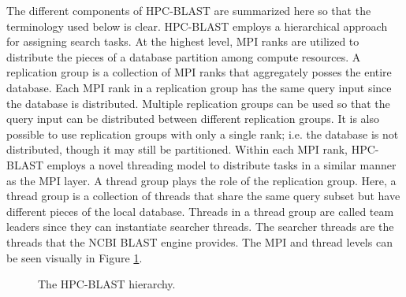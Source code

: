 \documentclass[10pt]{article}
\begin{document}
The different components of HPC-BLAST are summarized here so that the terminology used below is clear.  HPC-BLAST employs a hierarchical approach
for assigning search tasks.  At the highest level, MPI ranks are utilized to distribute the pieces of a database partition among compute resources.  A replication
group is a collection of MPI ranks that aggregately posses the entire database.  Each MPI rank in a replication group has the same query input since the database
is distributed.  Multiple replication groups can be used so that the query input can be distributed between different replication groups.  It is also possible to use
replication groups with only a single rank; i.e. the database is not distributed, though it may still be partitioned.  Within each MPI rank, HPC-BLAST employs a novel
threading model to distribute tasks in a similar manner as the MPI layer.  A thread group plays the role of the replication group.  Here, a thread group is a collection
of threads that share the same query subset but have different pieces of the local database.  Threads in a thread group are called team leaders since they can
instantiate searcher threads.  The searcher threads are the threads that the NCBI BLAST engine provides.  The MPI and thread levels can be seen visually in
Figure \ref{fig:hpc}.\\

\begin{figure}
  \centering
    \qquad
    \caption{The HPC-BLAST hierarchy.}%
    \label{fig:hpc}%
\end{figure}
\end{document}
